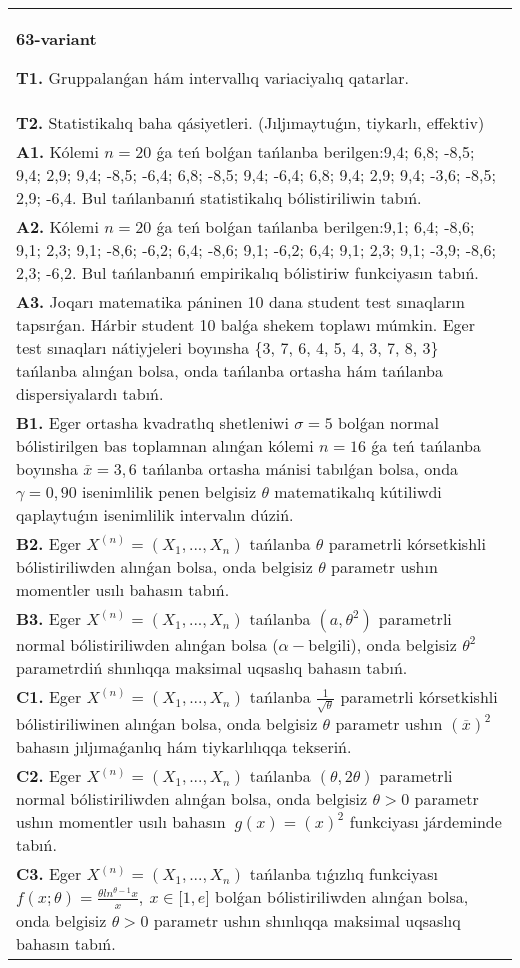\documentclass{article}
\begin{document}
\begin{tabular}{m{17cm}}
\textbf{63-variant}
\newline

\textbf{T1.} 
Gruppalanǵan hám intervallıq variaciyalıq qatarlar.
 \\
\textbf{T2.} 
Statistikalıq baha qásiyetleri. (Jıljımaytuǵın, tiykarlı, effektiv)
 \\
\textbf{A1.} 
Kólemi \(n = 20\) ǵa teń bolǵan tańlanba berilgen:9,4; 6,8; -8,5; 9,4; 2,9; 9,4; -8,5; -6,4; 6,8; -8,5; 9,4; -6,4; 6,8; 9,4; 2,9; 9,4; -3,6; -8,5; 2,9; -6,4. Bul tańlanbanıń statistikalıq bólistiriliwin tabıń.
 \\
\textbf{A2.} 
Kólemi \(n = 20\) ǵa teń bolǵan tańlanba berilgen:9,1; 6,4; -8,6; 9,1; 2,3; 9,1; -8,6; -6,2; 6,4; -8,6; 9,1; -6,2; 6,4; 9,1; 2,3; 9,1; -3,9; -8,6; 2,3; -6,2. Bul tańlanbanıń empirikalıq bólistiriw funkciyasın tabıń.
 \\
\textbf{A3.} 
Joqarı matematika páninen 10 dana student test sınaqların tapsırǵan. Hárbir student 10 balǵa shekem toplawı múmkin. Eger test sınaqları nátiyjeleri boyınsha \{3, 7, 6, 4, 5, 4, 3, 7, 8, 3\} tańlanba alınǵan bolsa, onda tańlanba ortasha hám tańlanba dispersiyalardı tabıń.
 \\
\textbf{B1.} 
Eger ortasha kvadratlıq shetleniwi \(\sigma = 5\) bolǵan normal bólistirilgen bas toplamnan alınǵan kólemi \(n = 16\) ǵa teń tańlanba boyınsha \(\overline{x} = 3,6\) tańlanba ortasha mánisi tabılǵan bolsa, onda \(\gamma = 0,90\) isenimlilik penen belgisiz \(\theta\) matematikalıq kútiliwdi qaplaytuǵın isenimlilik intervalın dúziń.
 \\
\textbf{B2.} 
Eger \(X^{(n)} = \left( X_{1},...,X_{n} \right)\) tańlanba \(\theta\) parametrli kórsetkishli bólistiriliwden alınǵan bolsa, onda belgisiz \(\theta\) parametr ushın momentler usılı bahasın tabıń.
 \\
\textbf{B3.} 
Eger \(X^{(n)} = \left( X_{1},...,X_{n} \right)\) tańlanba \(\left( a,\theta^{2} \right)\) parametrli normal bólistiriliwden alınǵan bolsa (\(\alpha -\)belgili), onda belgisiz \(\theta^{2}\) parametrdiń shınlıqqa maksimal uqsaslıq bahasın tabıń.
 \\
\textbf{C1.} 
Eger \(X^{(n)} = \left( X_{1},...,X_{n} \right)\) tańlanba \(\frac{1}{\sqrt{\theta}}\) parametrli kórsetkishli bólistiriliwinen alınǵan bolsa, onda belgisiz \(\theta\) parametr ushın \((\overline{x})^{2}\) bahasın jıljımaǵanlıq hám tiykarlılıqqa tekseriń.
 \\
\textbf{C2.} 
Eger \(X^{(n)} = \left( X_{1},...,X_{n} \right)\) tańlanba \((\theta,2\theta)\) parametrli normal bólistiriliwden alınǵan bolsa, onda belgisiz \(\theta > 0\) parametr ushın momentler usılı bahasın \({\ g(x) = (x)}^{2}\) funkciyası járdeminde tabıń.
 \\
\textbf{C3.} 
Eger \(X^{(n)} = \left( X_{1},...,X_{n} \right)\) tańlanba tıǵızlıq funkciyası
$f(x;\theta) = \frac{\theta ln^{\theta - 1}x}{x},\ x \in \lbrack 1,e\rbrack$
bolǵan bólistiriliwden alınǵan bolsa, onda belgisiz \(\theta > 0\) parametr ushın shınlıqqa maksimal uqsaslıq bahasın tabıń.
 \\

\end{tabular}
\vspace{1cm}
\end{document}
